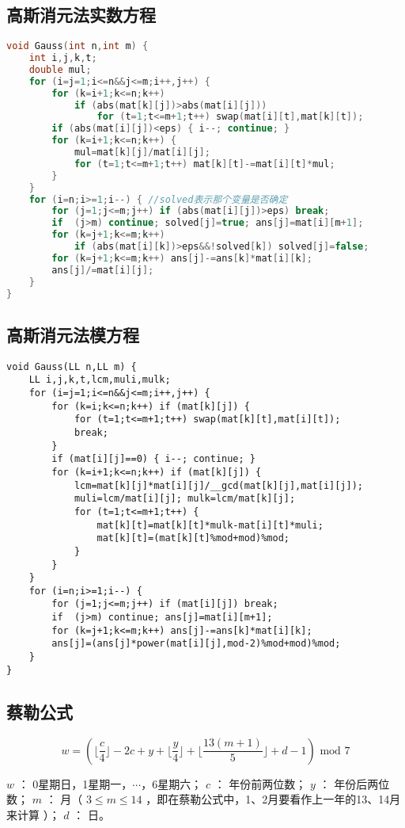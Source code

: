 \documentclass[landscape,a4paper]{article}
\begin{document}
\subsection{高斯消元法实数方程}
\begin{lstlisting}[language=C++]
void Gauss(int n,int m) {
	int i,j,k,t;
	double mul;
	for (i=j=1;i<=n&&j<=m;i++,j++) {
		for (k=i+1;k<=n;k++)
			if (abs(mat[k][j])>abs(mat[i][j]))
				for (t=1;t<=m+1;t++) swap(mat[i][t],mat[k][t]);
		if (abs(mat[i][j])<eps) { i--; continue; }
		for (k=i+1;k<=n;k++) {
			mul=mat[k][j]/mat[i][j];
			for (t=1;t<=m+1;t++) mat[k][t]-=mat[i][t]*mul;
		}
	}
	for (i=n;i>=1;i--) { //solved表示那个变量是否确定
		for (j=1;j<=m;j++) if (abs(mat[i][j])>eps) break;
		if  (j>m) continue; solved[j]=true; ans[j]=mat[i][m+1];
		for (k=j+1;k<=m;k++)
			if (abs(mat[i][k])>eps&&!solved[k]) solved[j]=false;
		for (k=j+1;k<=m;k++) ans[j]-=ans[k]*mat[i][k];
		ans[j]/=mat[i][j];
	}
}
\end{lstlisting}
\subsection{高斯消元法模方程}
\begin{lstlisting}
void Gauss(LL n,LL m) {
	LL i,j,k,t,lcm,muli,mulk;
	for (i=j=1;i<=n&&j<=m;i++,j++) {
		for (k=i;k<=n;k++) if (mat[k][j]) {
			for (t=1;t<=m+1;t++) swap(mat[k][t],mat[i][t]);
			break;
		}
		if (mat[i][j]==0) { i--; continue; }
		for (k=i+1;k<=n;k++) if (mat[k][j]) {
			lcm=mat[k][j]*mat[i][j]/__gcd(mat[k][j],mat[i][j]);
			muli=lcm/mat[i][j]; mulk=lcm/mat[k][j];
			for (t=1;t<=m+1;t++) {
				mat[k][t]=mat[k][t]*mulk-mat[i][t]*muli;
				mat[k][t]=(mat[k][t]%mod+mod)%mod;
			}
		}
	}
	for (i=n;i>=1;i--) {
		for (j=1;j<=m;j++) if (mat[i][j]) break;
		if  (j>m) continue; ans[j]=mat[i][m+1];
		for (k=j+1;k<=m;k++) ans[j]-=ans[k]*mat[i][k];
		ans[j]=(ans[j]*power(mat[i][j],mod-2)%mod+mod)%mod;
	}
}
\end{lstlisting}

\subsection{蔡勒公式}

$$w = (\lfloor \frac{c}{4} \rfloor - 2c + y + \lfloor \frac{y}{4} \rfloor + \lfloor \frac{13(m+1)}{5} \rfloor + d - 1) \text{ mod } 7$$

 $w$ ： 0星期日，1星期一，$\cdots$，6星期六；
 $c$ ： 年份前两位数；
 $y$ ： 年份后两位数；
 $m$ ： 月（ $3 \leq m \leq 14$ ，即在蔡勒公式中，1、2月要看作上一年的13、14月来计算 ）；
 $d$ ： 日。
\end{document}
